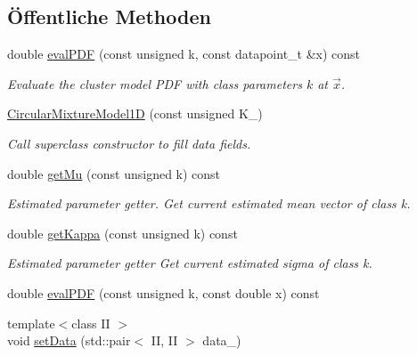 \subsection*{Öffentliche Methoden}
\begin{DoxyCompactItemize}
\item 
double \hyperlink{classCDA_1_1CircularMixtureModel1D_a975b92938beb21d0233e5a52ff017dc5}{evalPDF} (const unsigned k, const datapoint\_\-t \&x) const 
\begin{DoxyCompactList}\small\item\em Evaluate the cluster model PDF with class parameters $k$ at $\vec{x}$. \item\end{DoxyCompactList}\item 
\hypertarget{classCDA_1_1CircularMixtureModel1D_a3fe7def5d8f1007c598325625575d3e7}{
\hyperlink{classCDA_1_1CircularMixtureModel1D_a3fe7def5d8f1007c598325625575d3e7}{CircularMixtureModel1D} (const unsigned K\_\-)}
\label{classCDA_1_1CircularMixtureModel1D_a3fe7def5d8f1007c598325625575d3e7}

\begin{DoxyCompactList}\small\item\em Call superclass constructor to fill data fields. \item\end{DoxyCompactList}\item 
double \hyperlink{classCDA_1_1CircularMixtureModel1D_aca9e252cb363b74f6ef2bacb7eb505f6}{getMu} (const unsigned k) const 
\begin{DoxyCompactList}\small\item\em Estimated parameter getter. Get current estimated mean vector of class k. \item\end{DoxyCompactList}\item 
double \hyperlink{classCDA_1_1CircularMixtureModel1D_a1e29228c5ebe57babcf4857991b36a47}{getKappa} (const unsigned k) const 
\begin{DoxyCompactList}\small\item\em Estimated parameter getter Get current estimated sigma of class k. \item\end{DoxyCompactList}\item 
double \hyperlink{classCDA_1_1CircularMixtureModel1D_a5a138aadfa618e93c7f578752097363a}{evalPDF} (const unsigned k, const double x) const 
\item 
\hypertarget{classCDA_1_1CircularMixtureModel1D_a17c7d5dbf3571b3e48f5dff7598b03ca}{
{\footnotesize template$<$class II $>$ }\\void \hyperlink{classCDA_1_1CircularMixtureModel1D_a17c7d5dbf3571b3e48f5dff7598b03ca}{setData} (std::pair$<$ II, II $>$ data\_\-)}
\label{classCDA_1_1CircularMixtureModel1D_a17c7d5dbf3571b3e48f5dff7598b03ca}


\end{DoxyCompactItemize}
